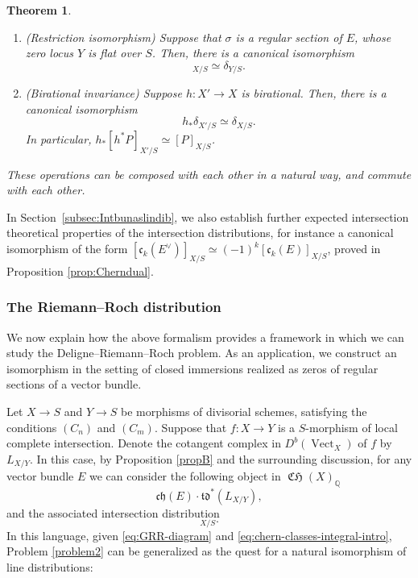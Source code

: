 \documentclass[11pt]{article}
\theoremstyle{plain}
\newtheorem{thm}{Theorem}
\theoremstyle{definition}
\newcommand{\QBbb}{\mathbb Q}
\newcommand{\cfrak}{\mathfrak c}
\newcommand{\chfrak}{\mathfrak {ch}}
\newcommand{\tdfrak}{\mathfrak {td}}
\DeclareMathOperator{\CHfrak}{\mathfrak{CH}}
\DeclareMathOperator{\Vect}{Vect}
\begin{document}
\begin{thm}
\begin{enumerate}
\item\label{item:thmE-5} (Restriction isomorphism) Suppose that $\sigma$ is a regular section of $E$, whose zero locus $Y$ is flat over $S$. Then, there is a canonical isomorphism
\begin{displaymath}
[ \cfrak_{r}(E) ]_{X/S} \simeq \delta_{Y/S}.
\end{displaymath}
\item\label{item:prop-int-dist-birational1} (Birational invariance) Suppose $h \colon X' \to X$ is birational. Then, there is a canonical isomorphism
\begin{displaymath}
h_\ast \delta_{X'/S}\simeq \delta_{X/S}.
\end{displaymath}
In particular, $h_{\ast}[h^{\ast}P]_{X'/S}\simeq [P]_{X/S}$.
\end{enumerate}
These operations can be composed with each other in a natural way, and commute with each other.

\end{thm}
In Section~\ref{subsec:Intbunaslindib}, we also establish further expected intersection theoretical properties of the intersection distributions, for instance a canonical isomorphism of the form $[\cfrak_{k}(E^{\vee})]_{X/S}\simeq (-1)^{k}[\cfrak_{k}(E)]_{X/S}$, proved in Proposition \ref{prop:Cherndual}.

\subsubsection*{The Riemann--Roch distribution}
We now explain how the above formalism provides a framework in which we can study the Deligne--Riemann--Roch problem. As an application, we construct an isomorphism in the setting of closed immersions realized as zeros of regular sections of a vector bundle.

Let $X\to S$ and $Y\to S$ be morphisms of divisorial schemes, satisfying the conditions $(C_{n})$ and $(C_{m})$. Suppose that $f\colon X\to Y$ is a $S$-morphism of local complete intersection. Denote the cotangent complex in $D^{b}(\Vect_X)$ of $f$ by $L_{X/Y}$. In this case, by Proposition \ref{propB} and the surrounding discussion, for any vector bundle $E$ we can consider the following object in $\CHfrak(X)_{\QBbb}$
\begin{displaymath}
\chfrak(E) \cdot \tdfrak^\ast(L_{X/Y}),
\end{displaymath}
and the associated intersection distribution
\begin{displaymath}
[\chfrak(E) \cdot \tdfrak^{\ast}(L_{X/Y})]_{X/S}.
\end{displaymath}
In this language, given \eqref{eq:GRR-diagram} and \eqref{eq:chern-classes-integral-intro}, Problem \ref{problem2} can be generalized as the quest for a natural isomorphism of line distributions:
\end{document}
